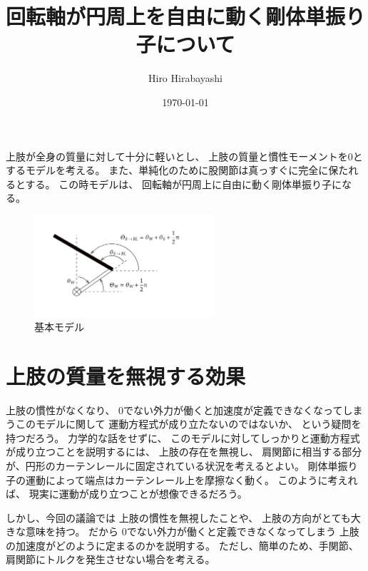 \documentclass[a4paper,11pt]{jsarticle}
\begin{document}
\title{回転軸が円周上を自由に動く剛体単振り子について}
\author{Hiro Hirabayashi}
\date{\today}
\maketitle


上肢が全身の質量に対して十分に軽いとし、
上肢の質量と慣性モーメントを$0$とするモデルを考える。
また、単純化のために股関節は真っすぐに完全に保たれるとする。
この時モデルは、
回転軸が円周上に自由に動く剛体単振り子になる。

\begin{figure}[h]
  \centering
  \includegraphics[width = 0.6\textwidth]{config.png}
  \caption{基本モデル}
  \label{config.png}
\end{figure}

\section{上肢の質量を無視する効果}

上肢の慣性がなくなり、
0でない外力が働くと加速度が定義できなくなってしまうこのモデルに関して
運動方程式が成り立たないのではないか、
という疑問を持つだろう。
力学的な話をせずに、
このモデルに対してしっかりと運動方程式が成り立つことを説明するには、
上肢の存在を無視し、
肩関節に相当する部分が、円形のカーテンレールに固定されている状況を考えるとよい。
剛体単振り子の運動によって端点はカーテンレール上を摩擦なく動く。
このように考えれば、
現実に運動が成り立つことが想像できるだろう。

しかし、今回の議論では
上肢の慣性を無視したことや、
上肢の方向がとても大きな意味を持つ。
だから
0でない外力が働くと定義できなくなってしまう
上肢の加速度がどのように定まるのかを説明する。
ただし、簡単のため、手関節、肩関節にトルクを発生させない場合を考える。
\end{document}
